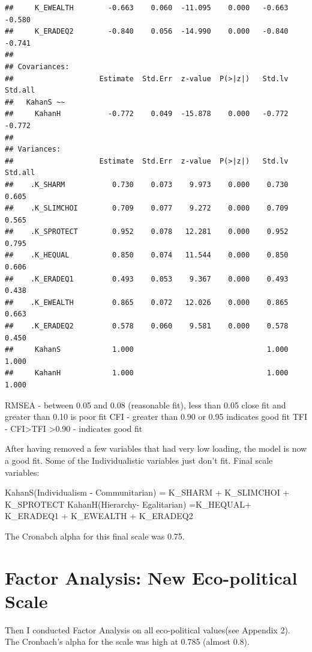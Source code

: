 \documentclass[
]{article}
\begin{document}
\begin{verbatim}
##     K_EWEALTH        -0.663    0.060  -11.095    0.000   -0.663   -0.580
##     K_ERADEQ2        -0.840    0.056  -14.990    0.000   -0.840   -0.741
## 
## Covariances:
##                    Estimate  Std.Err  z-value  P(>|z|)   Std.lv  Std.all
##   KahanS ~~                                                             
##     KahanH           -0.772    0.049  -15.878    0.000   -0.772   -0.772
## 
## Variances:
##                    Estimate  Std.Err  z-value  P(>|z|)   Std.lv  Std.all
##    .K_SHARM           0.730    0.073    9.973    0.000    0.730    0.605
##    .K_SLIMCHOI        0.709    0.077    9.272    0.000    0.709    0.565
##    .K_SPROTECT        0.952    0.078   12.281    0.000    0.952    0.795
##    .K_HEQUAL          0.850    0.074   11.544    0.000    0.850    0.606
##    .K_ERADEQ1         0.493    0.053    9.367    0.000    0.493    0.438
##    .K_EWEALTH         0.865    0.072   12.026    0.000    0.865    0.663
##    .K_ERADEQ2         0.578    0.060    9.581    0.000    0.578    0.450
##     KahanS            1.000                               1.000    1.000
##     KahanH            1.000                               1.000    1.000
\end{verbatim}

RMSEA - between 0.05 and 0.08 (reasonable fit), less than 0.05 close fit
and greater than 0.10 is poor fit CFI - greater than 0.90 or 0.95
indicates good fit TFI - CFI\textgreater TFI \textgreater0.90 -
indicates good fit

After having removed a few variables that had very low loading, the
model is now a good fit. Some of the Individualistic variables just
don't fit. Final scale variables:

KahanS(Individualism - Communitarian) = K\_SHARM + K\_SLIMCHOI +
K\_SPROTECT KahanH(Hierarchy- Egalitarian) =K\_HEQUAL+ K\_ERADEQ1 +
K\_EWEALTH + K\_ERADEQ2

The Cronabch alpha for this final scale was 0.75.

\newpage

\hypertarget{factor-analysis-new-eco-political-scale}{%
\section{Factor Analysis: New Eco-political
Scale}\label{factor-analysis-new-eco-political-scale}}

Then I conducted Factor Analysis on all eco-political values(see
Appendix 2). The Cronbach's alpha for the scale was high at 0.785
(almost 0.8).
\end{document}
